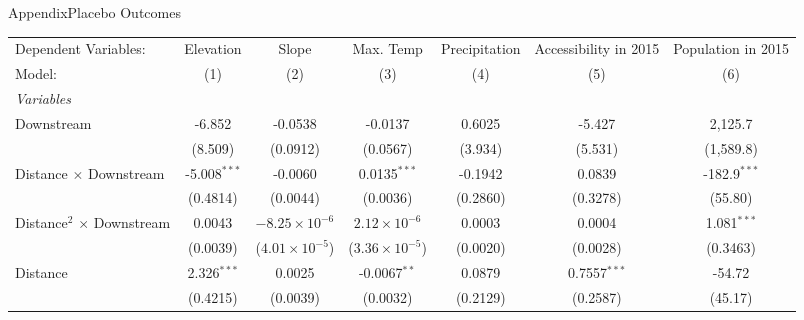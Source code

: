 \documentclass[aspectratio=169,11pt,dvipsnames, handout]{beamer}
\begin{document}
\begin{frame}{\textcolor{defaultclr!30}{Appendix}\hspace{0.75em}Placebo Outcomes}
\label{frame:placebo}
\begin{adjustbox}{width = \textwidth, center}
   \begin{tabular}{lcccccc}\label{tab:placebo_outcomes_quadratic}
      \tabularnewline \midrule \midrule
      Dependent Variables:              & Elevation      & Slope                   & Max. Temp               & Precipitation        & Accessibility in 2015 & Population in 2015\\  
      Model:                            & (1)            & (2)                     & (3)                     & (4)                  & (5)                   & (6)\\  
      \midrule
      \emph{Variables}\\
      Downstream                        & -6.852         & -0.0538                 & -0.0137                 & 0.6025               & -5.427                & 2,125.7\\   
                                        & (8.509)        & (0.0912)                & (0.0567)                & (3.934)              & (5.531)               & (1,589.8)\\   
      Distance $\times$ Downstream      & -5.008$^{***}$ & -0.0060                 & 0.0135$^{***}$          & -0.1942              & 0.0839                & -182.9$^{***}$\\   
                                        & (0.4814)       & (0.0044)                & (0.0036)                & (0.2860)             & (0.3278)              & (55.80)\\   
      Distance$^2$ $\times$ Downstream  & 0.0043         & $-8.25\times 10^{-6}$   & $2.12\times 10^{-6}$    & 0.0003               & 0.0004                & 1.081$^{***}$\\   
                                        & (0.0039)       & ($4.01\times 10^{-5}$)  & ($3.36\times 10^{-5}$)  & (0.0020)             & (0.0028)              & (0.3463)\\   
      Distance                          & 2.326$^{***}$  & 0.0025                  & -0.0067$^{**}$          & 0.0879               & 0.7557$^{***}$        & -54.72\\   
                                        & (0.4215)       & (0.0039)                & (0.0032)                & (0.2129)             & (0.2587)              & (45.17)\\   

\end{tabular}
\end{adjustbox}
\end{frame}
\end{document}
